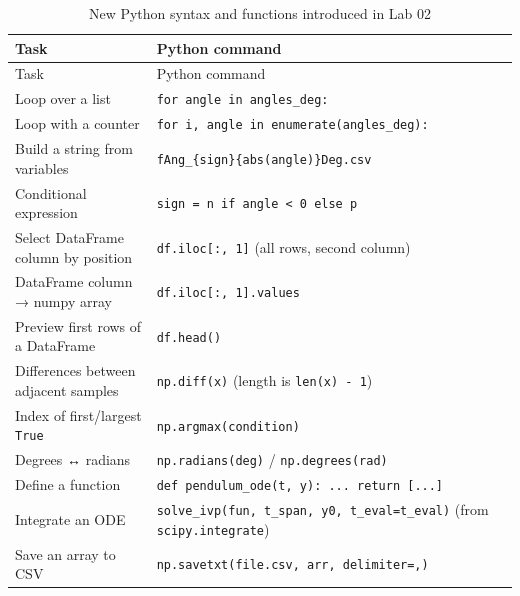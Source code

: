 \documentclass[
  12pt,
  letterpaper,
]{article}
\begin{document}
\begin{longtable}[]{@{}
  >{\raggedright\arraybackslash}p{}
  >{\raggedright\arraybackslash}p{}@{}}
\caption{New Python syntax and functions introduced in Lab
02}\tabularnewline
\toprule\noalign{}
\begin{minipage}[b]{\linewidth}\raggedright
Task
\end{minipage} & \begin{minipage}[b]{\linewidth}\raggedright
Python command
\end{minipage} \\
\midrule\noalign{}
\endfirsthead
\toprule\noalign{}
\begin{minipage}[b]{\linewidth}\raggedright
Task
\end{minipage} & \begin{minipage}[b]{\linewidth}\raggedright
Python command
\end{minipage} \\
\midrule\noalign{}
\endhead
\bottomrule\noalign{}
\endlastfoot
Loop over a list & \texttt{for\ angle\ in\ angles\_deg:} \\
Loop with a counter &
\texttt{for\ i,\ angle\ in\ enumerate(angles\_deg):} \\
Build a string from variables &
\texttt{f\textquotesingle{}Ang\_\{sign\}\{abs(angle)\}Deg.csv\textquotesingle{}} \\
Conditional expression &
\texttt{sign\ =\ \textquotesingle{}n\textquotesingle{}\ if\ angle\ \textless{}\ 0\ else\ \textquotesingle{}p\textquotesingle{}} \\
Select DataFrame column by position & \texttt{df.iloc{[}:,\ 1{]}} (all
rows, second column) \\
DataFrame column → numpy array & \texttt{df.iloc{[}:,\ 1{]}.values} \\
Preview first rows of a DataFrame & \texttt{df.head()} \\
Differences between adjacent samples & \texttt{np.diff(x)} (length is
\texttt{len(x)\ -\ 1}) \\
Index of first/largest \texttt{True} & \texttt{np.argmax(condition)} \\
Degrees ↔ radians & \texttt{np.radians(deg)} /
\texttt{np.degrees(rad)} \\
Define a function &
\texttt{def\ pendulum\_ode(t,\ y):\ ...\ return\ {[}...{]}} \\
Integrate an ODE &
\texttt{solve\_ivp(fun,\ t\_span,\ y0,\ t\_eval=t\_eval)} (from
\texttt{scipy.integrate}) \\
Save an array to CSV &
\texttt{np.savetxt(\textquotesingle{}file.csv\textquotesingle{},\ arr,\ delimiter=\textquotesingle{},\textquotesingle{})} \\
\end{longtable}
\end{document}
